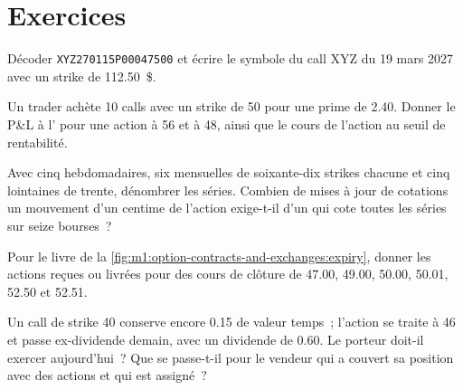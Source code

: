 \section{Exercices}

\begin{exercise}[$\star$]\label{exo:m1:option-contracts-and-exchanges:1}
Décoder \texttt{XYZ\textvisiblespace\textvisiblespace\textvisiblespace270115P00047500}
et écrire le symbole du call XYZ du 19 mars 2027 avec un strike de
112.50~\$.
\end{exercise}

\begin{exercise}[$\star$]\label{exo:m1:option-contracts-and-exchanges:2}
Un trader achète 10 calls avec un strike de 50 pour une prime de 2.40. Donner le
P\&L à l' pour une action à 56 et à 48, ainsi que le cours de l'action au
seuil de rentabilité.
\end{exercise}

\begin{exercise}[$\star$]\label{exo:m1:option-contracts-and-exchanges:3}
Avec cinq  hebdomadaires, six  mensuelles de soixante-dix strikes chacune et cinq
 lointaines de trente, dénombrer les séries. Combien de mises à jour de
cotations un mouvement d'un centime de l'action exige-t-il d'un  qui cote toutes
les séries sur seize bourses~?
\end{exercise}

\begin{exercise}[$\star\star$]\label{exo:m1:option-contracts-and-exchanges:4}
Pour le livre de la \cref{fig:m1:option-contracts-and-exchanges:expiry}, donner les
actions reçues ou livrées pour des cours de clôture de 47.00, 49.00, 50.00,
50.01, 52.50 et 52.51.
\end{exercise}

\begin{exercise}[$\star\star$]\label{exo:m1:option-contracts-and-exchanges:5}
Un call de strike 40 conserve encore 0.15 de valeur temps~; l'action se traite à
46 et passe ex-dividende demain, avec un dividende de 0.60. Le porteur doit-il
exercer aujourd'hui~? Que se passe-t-il pour le vendeur qui a couvert sa position avec des actions et qui est
assigné~?
\end{exercise}


